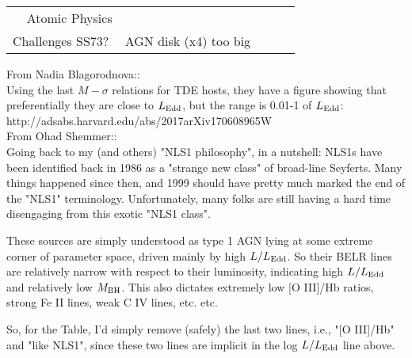 \documentclass[11pt]{article}
\begin{document}
\begin{table}
\begin{center}
\begin{tabular}{lcccr}
$\;\;\;\;$Atomic Physics                    & & & \\
Challenges SS73?              & AGN disk (x4) too big      &     &     \\
        \hline
        \hline 
     \end{tabular}
  \end{center}
\end{table}



\clearpage
\normalsize
From Nadia Blagorodnova:: \\ 
Using the last $M-\sigma$ relations for TDE
hosts, they have a figure showing that preferentially they are close
to $L_{\rm Edd}$, but the range is 0.01-1 of $L_{\rm Edd}$:
http://adsabs.harvard.edu/abs/2017arXiv170608965W \\

\medskip \medskip
From Ohad Shemmer:: \\
Going back to my (and others) "NLS1 philosophy", in a nutshell:
NLS1s have been identified back in 1986 as a "strange new class"
of broad-line Seyferts. Many things happened since then, and 1999
should have pretty much marked the end of the "NLS1" terminology.
Unfortunately, many folks are still having a hard time disengaging from
this exotic "NLS1 class".

These sources are simply understood as type 1 AGN lying at some
extreme corner of parameter space, driven mainly by high $L/L_{\rm
Edd}$.  So their BELR lines are relatively narrow with respect to
their luminosity, indicating high $L/L_{\rm Edd}$ and relatively low
$M_{\rm BH}$. This also dictates extremely low [O III]/Hb ratios, strong Fe II
lines, weak C IV lines, etc. etc.

So, for the Table, I'd simply remove (safely) the last two lines,
i.e., "[O III]/Hb" and "like NLS1", since these two lines are implicit
in the log $L/L_{\rm Edd}$ line above.
\end{document}
